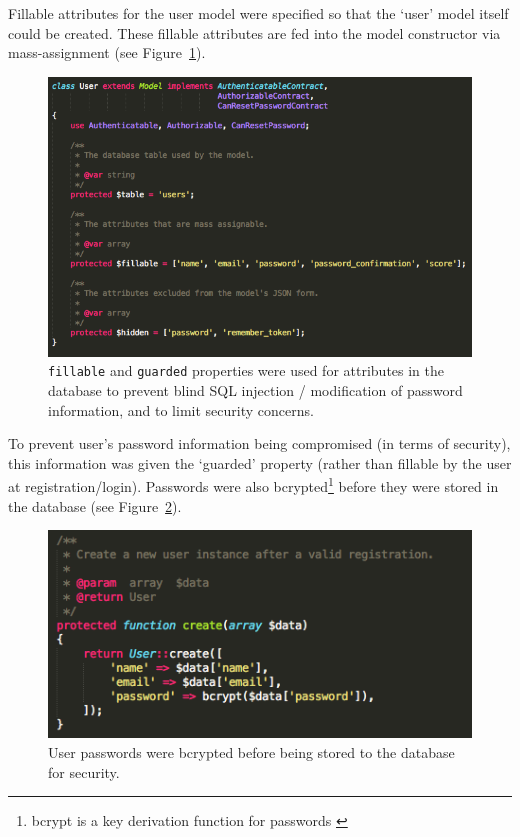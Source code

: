 \documentclass[a4paper, 11pt]{article}
\begin{document}
Fillable attributes for the user model were specified so that the `user' model itself could be created. These fillable attributes are fed into the model constructor via mass-assignment (see Figure~\ref{fillable}). 


\begin{figure}[H]
\begin{center}
\includegraphics[scale=0.5]{fillable}
\caption{\texttt{fillable} and \texttt{guarded} properties were used for attributes in the database to prevent blind SQL injection / modification of password information, and to limit security concerns.}
\label{fillable}
\end{center}
\end{figure}
To prevent user's password information being compromised (in terms of security), this information was given the `guarded' property (rather than fillable by the user at registration/login). Passwords were also bcrypted\footnote{bcrypt is a key derivation function for passwords \cite {bcrypt}} before they were stored in the database (see Figure~\ref{bcrypt}).

\begin{figure}[H]
\begin{center}
\includegraphics[scale=0.5]{bcrypt}
\caption{User passwords were bcrypted before being stored to the database for security.}
\label{bcrypt}
\end{center}
\end{figure}
\end{document}

